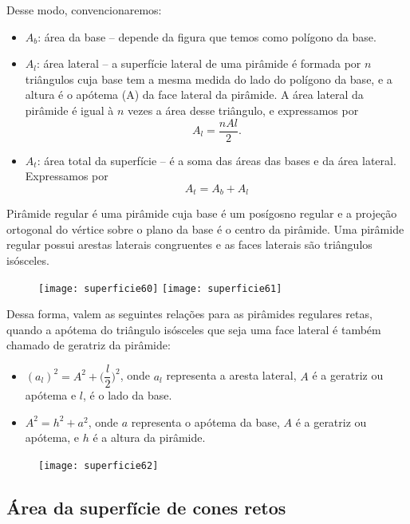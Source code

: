 Desse modo, convencionaremos:
\begin{itemize}
  \item $A_b$: área da base -- depende da figura que temos como polígono da base.
  \item $A_l$: área lateral -- a superfície lateral de uma pirâmide é formada por $n$ triângulos cuja base tem a mesma medida do lado do polígono da base, e a altura é o apótema (A) da face lateral da pirâmide. A área lateral da pirâmide é igual à $n$ vezes a área desse triângulo, e expressamos por
  \begin{equation*}
  A_l=\frac{nAl}{2}.
  \end{equation*}
  \item $A_t$: área total da superfície -- é a soma das áreas das bases e da área lateral. Expressamos por 
  \begin{equation*}
  A_t=A_b+A_l
  \end{equation*}
\end{itemize}

Pirâmide regular é uma pirâmide cuja base é um posígosno regular e a projeção ortogonal do vértice sobre o plano da base é o centro da pirâmide. Uma pirâmide regular possui arestas laterais congruentes e as faces laterais são triângulos isósceles.

\begin{figure}[H]
\centering

\texttt{[image: superficie60]}\hspace{.5em}
\texttt{[image: superficie61]}
\end{figure}

Dessa forma, valem as seguintes relações para as pirâmides regulares retas, quando a apótema do triângulo isósceles que seja uma face lateral é também chamado de geratriz da pirâmide:
\begin{itemize}
  \item $(a_l)^2=A^2+\bigg(\dfrac{l}{2}\bigg)^2$, onde $a_l$ representa a aresta lateral, $A$ é a geratriz ou apótema e $l$, é o lado da base.
  \item $A^2=h^2+a^2$, onde $a$ representa o apótema da base, $A$ é a geratriz ou apótema, e $h$ é a altura da pirâmide.
\end{itemize}

\begin{figure}[H]
\centering

\texttt{[image: superficie62]}
\end{figure}

\subsection{ Área da superfície de cones retos}

